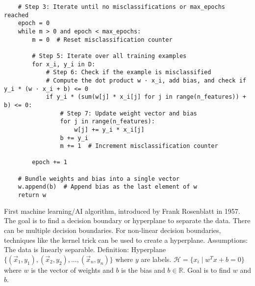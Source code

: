 \begin{outline}
\begin{verbatim}
    # Step 3: Iterate until no misclassifications or max_epochs reached
    epoch = 0
    while m > 0 and epoch < max_epochs:
        m = 0  # Reset misclassification counter
        
        # Step 5: Iterate over all training examples
        for x_i, y_i in D:
            # Step 6: Check if the example is misclassified
            # Compute the dot product w · x_i, add bias, and check if y_i * (w · x_i + b) <= 0
            if y_i * (sum(w[j] * x_i[j] for j in range(n_features)) + b) <= 0:
                # Step 7: Update weight vector and bias
                for j in range(n_features):
                    w[j] += y_i * x_i[j]
                b += y_i
                m += 1  # Increment misclassification counter
        
        epoch += 1
    
    # Bundle weights and bias into a single vector
    w.append(b)  # Append bias as the last element of w
    return w
\end{verbatim}
    
\end{outline}


\begin{outline}
    \1 First machine learning/AI algorithm, introduced by Frank Rosenblatt in 1957.
    \1 The goal is to find a decision boundary or hyperplane to separate the data. There can be multiple decision boundaries.
    \1 For non-linear decision boundaries, techniques like the kernel trick can be used to create a hyperplane.
    \1 Assumptions:
        \2 The data is linearly separable.
    \1 Definition: Hyperplane
        \2 $\{(\vec{x}_1,y_1),(\vec{x}_2,y_2),...,(\vec{x}_n,y_n)\}$ where $y$ are labels.
        \2 $\mathcal{H}=\{x_i\mid w^Tx+b=0\}$ where $w$ is the vector of weights and $b$ is the bias and $b\in\mathbb{R}$.
        \2 Goal is to find $w$ and $b$.
\end{outline}
